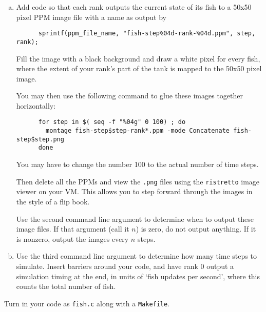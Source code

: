 \documentclass[11pt]{article}
\begin{document}
\begin{enumerate}[a)]
  \item Add code so that each rank outputs the current state of its
    fish to a 50x50 pixel PPM image file with a name as output by
    \begin{lstlisting}
      sprintf(ppm_file_name, "fish-step%04d-rank-%04d.ppm", step, rank);
    \end{lstlisting}
    Fill the image with a black background and draw a white pixel for
    every fish, where the extent of your rank's part of the tank is
    mapped to the 50x50 pixel image.

    You may then use the following command to glue these images
    together horizontally:
    \begin{lstlisting}
      for step in $( seq -f "%04g" 0 100) ; do
        montage fish-step$step-rank*.ppm -mode Concatenate fish-step$step.png
      done
    \end{lstlisting}%
    You may have to change the number 100 to the actual number of time
    steps.

    Then delete all the PPMs and view the \texttt{.png} files using
    the \texttt{ristretto} image viewer on your VM. This allows you to
    step forward through the images in the style of a flip book.

    Use the second command line argument to determine when to output
    these image files. If that argument (call it $n$) is zero, do not
    output anything.  If it is nonzero, output the images every $n$
    steps.

  \item Use the third command line argument to determine how many time
    steps to simulate. Insert barriers around your code, and have 
    rank 0 output a simulation timing at the end, in units of `fish
    updates per second', where this counts the total number of fish.
\end{enumerate}
Turn in your code as \texttt{fish.c} along with a \texttt{Makefile}.
\end{document}
